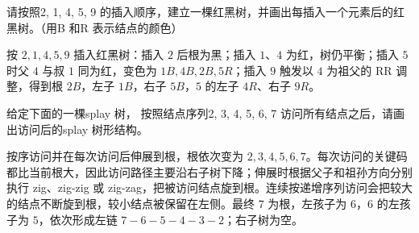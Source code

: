 \begin{question}[3 分]
请按照2, 1, 4, 5, 9 的插入顺序，建立一棵红黑树，并画出每插入一个元素后的红黑树。（用B 和R 表示结点的颜色）

\begin{solution}
按 $2,1,4,5,9$ 插入红黑树：插入 $2$ 后根为黑；插入 $1$、$4$ 为红，树仍平衡；插入 $5$ 时父 $4$ 与叔 $1$ 同为红，变色为 $1B,4B,2B,5R$；插入 $9$ 触发以 $4$ 为祖父的 RR 调整，得到根 $2B$，左子 $1B$，右子 $5B$，$5$ 的左子 $4R$、右子 $9R$。
\end{solution}
\end{question}

\begin{question}[2 分]
给定下面的一棵splay 树， 按照结点序列2, 3, 4, 5, 6, 7 访问所有结点之后，请画出访问后的splay 树形结构。

\begin{center}
\end{center}
\begin{solution}
按序访问并在每次访问后伸展到根，根依次变为 $2,3,4,5,6,7$。每次访问的关键码都比当前根大，因此访问路径主要沿右子树下降；伸展时根据父子和祖孙方向分别执行 zig、zig-zig 或 zig-zag，把被访问结点旋到根。连续按递增序列访问会把较大的结点不断旋到根，较小结点被保留在左侧。最终 $7$ 为根，左孩子为 $6$，$6$ 的左孩子为 $5$，依次形成左链 $7-6-5-4-3-2$；右子树为空。
\end{solution}
\end{question}

